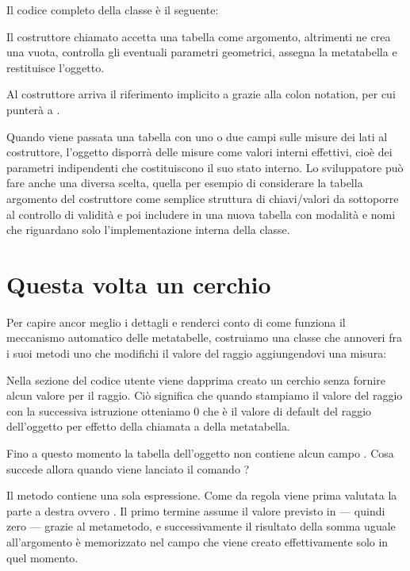 Il codice completo della classe  è il seguente:

Il costruttore chiamato  accetta una tabella come argomento, altrimenti
ne crea una vuota, controlla gli eventuali parametri geometrici, assegna la
metatabella e restituisce l'oggetto.

Al costruttore  arriva il riferimento implicito a 
grazie alla colon notation, per cui  punterà a .

Quando viene passata una tabella con uno o due campi sulle misure dei lati al
costruttore, l'oggetto disporrà delle misure come valori interni effettivi,
cioè dei parametri indipendenti che costituiscono il suo stato interno. Lo
sviluppatore può fare anche una diversa scelta, quella per esempio di
considerare la tabella argomento del costruttore come semplice struttura di
chiavi/valori da sottoporre al controllo di validità e poi includere in una
nuova tabella con modalità e nomi che riguardano solo l'implementazione interna
della classe.


\section{Questa volta un cerchio}

Per capire ancor meglio i dettagli e renderci conto di come funziona il
meccanismo automatico delle metatabelle, costruiamo una classe 
che annoveri fra i suoi metodi uno che modifichi il valore del raggio
aggiungendovi una misura:

Nella sezione del codice utente viene dapprima creato un cerchio senza fornire
alcun valore per il raggio. Ciò significa che quando stampiamo il valore del
raggio con la successiva istruzione otteniamo 0 che è il valore di default del
raggio dell'oggetto  per effetto della chiamata a 
della metatabella.

Fino a questo momento la tabella dell'oggetto  non contiene alcun campo
. Cosa succede allora quando viene lanciato il comando
?

Il metodo  contiene una sola espressione. Come da regola viene
prima valutata la parte a destra ovvero . Il primo termine
assume il valore previsto in  --- quindi zero --- grazie al
metametodo, e successivamente il risultato della somma uguale all'argomento
 è memorizzato nel campo  che viene creato effettivamente
solo in quel momento.



